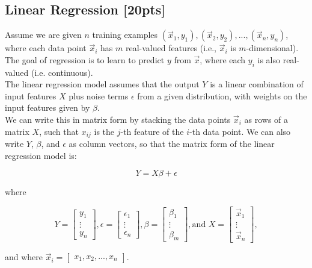 \documentclass[paper=a4, fontsize=11pt]{scrartcl} %
\numberwithin{figure}{section} %
\numberwithin{table}{section} %
\begin{document}
\subsection{Linear Regression \textbf{[20pts]}}

Assume we are given $n$ training examples $(\vec{x}_1, y_1), (\vec{x}_2, y_2), ..., (\vec{x}_n, y_n)$, where each data point $\vec{x}_i$ has $m$ real-valued features (i.e., $\vec{x}_i$ is $m$-dimensional). The goal of regression is to learn to predict $y$ from $\vec{x}$, where each $y_i$ is also real-valued (i.e. continuous). \\

The linear regression model assumes that the output $Y$ is a linear combination of input features $X$ plus noise terms $\epsilon$ from a given distribution, with weights on the input features given by $\beta$. \\

We can write this in matrix form by stacking the data points $\vec{x}_i$ as rows of a matrix $X$, such that $x_{ij}$ is the $j$-th feature of the $i$-th data point. We can also write $Y$, $\beta$, and $\epsilon$ as column vectors, so that the matrix form of the linear regression model is:

$$
Y = X\beta + \epsilon
$$

where

$$
Y = 
\begin{bmatrix}
	y_1 \\
	\vdots \\
	y_n
\end{bmatrix},
\epsilon =
\begin{bmatrix}
	\epsilon_1 \\
	\vdots \\
	\epsilon_n
\end{bmatrix},
\beta =
\begin{bmatrix}
	\beta_1 \\
	\vdots \\
	\beta_m
\end{bmatrix},
\textrm{and } X = 
\begin{bmatrix}
	\vec{x}_1 \\
	\vdots \\
	\vec{x}_n
\end{bmatrix},
$$

and where $\vec{x}_i = \begin{bmatrix}x_1, x_2, ..., x_n\end{bmatrix}$. \\
\end{document}
